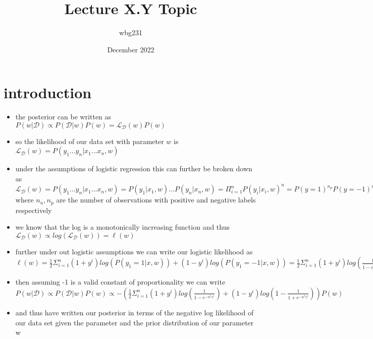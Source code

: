 \documentclass{article}
\title{Lecture X.Y Topic}
\author{wbg231 }
\date{December 2022}
\begin{document}
\maketitle

\section{introduction}
\begin{itemize}
\item the posterior can be written as $P(w|\mathcal{D}) \propto P(\mathcal{D}|w)P(w)=\mathcal{L}_{\mathcal{D}}(w)P(w)$
\item so the likelihood of our data set with parameter $w$ is $\mathcal{L}_{\mathcal{D}}(w)=P(y_1...y_n|x_1...x_n, w)$
\item under the assumptions of logistic regression this can further be broken down as $\mathcal{L}_{\mathcal{D}}(w)=P(y_1...y_n|x_1...x_n, w)=P(y_1|x_1,w)...P(y_n|x_n,w)=\Pi_{i=1}^{n}P(y_i|x_i, w)^{n}=P(y=1)^{n_p}P(y=-1)^{n_n}$ where $n_n,n_p$ are the number of observations with positive and negative labels respectively
\item we know that the log is a monotonically increasing function and thus $\mathcal{L}_{\mathcal{D}}(w)\propto log(\mathcal{L}_{\mathcal{D}}(w))=\ell(w)$
\item further under out logistic assumptions we can write our logistic likelihood as $\ell(w)=\frac{1}{2}\Sigma_{i=1}^{n} (1+y^i)log(P(y_1=1|x,w))+(1-y^i)log(P(y_1=-1|x,w))=\frac{1}{2}\Sigma_{i=1}^{n} (1+y^i)log(\frac{1}{1-e^{-w^tx^i}})+(1-y^i)log(1-\frac{1}{1+e^{-w^tx^i}})$
\item then assuming -1 is a valid constant of proportionality we can write $P(w|\mathcal{D}) \propto P(\mathcal{D}|w)P(w)\propto -(\frac{1}{2}\Sigma_{i=1}^{n} (1+y^i)log(\frac{1}{1-e^{-w^tx^i}})+(1-y^i)log(1-\frac{1}{1+e^{-w^tx^i}}))P(w)$ 
\item and thus have written our posterior in terms of the negative log likelihood of our data set given the parameter and the prior distribution of our parameter w 
\end{itemize}
\end{document}
